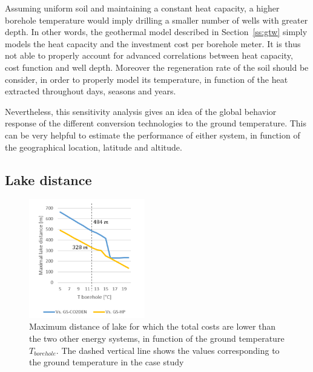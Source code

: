 \documentclass{article}
\begin{document}
Assuming uniform soil and maintaining a constant heat capacity, a higher borehole temperature would imply drilling a smaller number of wells with greater depth. In other words, the geothermal model described in Section~\ref{ss:gtw} simply models the heat capacity and the investment cost per borehole meter. It is thus not able to properly account for advanced correlations between heat capacity, cost function and well depth. Moreover the regeneration rate of the soil should be consider, in order to properly model its temperature, in function of the heat extracted throughout days, seasons and years.

Nevertheless, this sensitivity analysis gives an idea of the global behavior response of the different conversion technologies to the ground temperature. This can be very helpful to estimate the performance of either system, in function of the geographical location, latitude and altitude.


\subsection{Lake distance}

%

\begin{figure} 
	\vspace{-20pt}
	\centering
	\includegraphics[width=0.45\textwidth]{lakeDist.png}
	\caption{Maximum distance of lake for which the total costs are lower than the two other energy systems, in function of the ground temperature $T_{borehole}$. The dashed vertical line shows the values corresponding to the ground temperature in the case study}
	\label{fig:lakeDist}
	\vspace{-10pt}
\end{figure}
\end{document}
